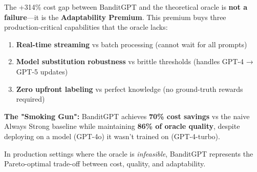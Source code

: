 \begin{tcolorbox}[colback=blue!5!white,colframe=blue!75!black,title=Key Insight: The Adaptability Premium]
The +314\% cost gap between BanditGPT and the theoretical oracle is \textbf{not a failure}—it is the \textbf{Adaptability Premium}. This premium buys three production-critical capabilities that the oracle lacks:

\begin{enumerate}
    \item \textbf{Real-time streaming} vs batch processing (cannot wait for all prompts)
    \item \textbf{Model substitution robustness} vs brittle thresholds (handles GPT-4 → GPT-5 updates)
    \item \textbf{Zero upfront labeling} vs perfect knowledge (no ground-truth rewards required)
\end{enumerate}

\textbf{The "Smoking Gun":} BanditGPT achieves \textbf{70\% cost savings} vs the naive Always Strong baseline while maintaining \textbf{86\% of oracle quality}, despite deploying on a model (GPT-4o) it wasn't trained on (GPT-4-turbo). 

In production settings where the oracle is \emph{infeasible}, BanditGPT represents the Pareto-optimal trade-off between cost, quality, and adaptability.
\end{tcolorbox}


